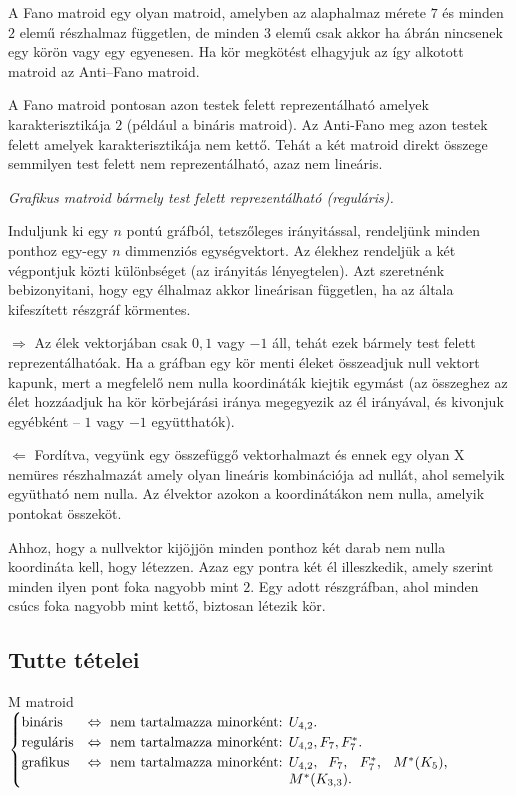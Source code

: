 A Fano matroid egy olyan matroid, amelyben az alaphalmaz mérete $7$ és minden
$2$ elemű részhalmaz független, de minden $3$ elemű csak akkor ha
 ábrán nincsenek egy körön vagy egy egyenesen. Ha kör megkötést
elhagyjuk az így alkotott matroid az Anti--Fano matroid.

A Fano matroid pontosan azon testek felett reprezentálható amelyek
karakterisztikája $2$ (például a bináris matroid). Az Anti-Fano meg azon testek
felett amelyek karakterisztikája nem kettő. Tehát a két matroid direkt összege
semmilyen test felett nem reprezentálható, azaz nem lineáris.

\vspace{0.4cm}
\emph{Grafikus matroid bármely test felett reprezentálható (reguláris).}
\vspace{0.4cm}

Induljunk ki egy $n$ pontú gráfból, tetszőleges irányitással, rendeljünk minden
ponthoz egy-egy $n$ dimmenziós egységvektort. Az élekhez rendeljük a két
végpontjuk közti különbséget (az irányitás lényegtelen). Azt szeretnénk
bebizonyitani, hogy egy élhalmaz akkor lineárisan független, ha az általa
kifeszített részgráf körmentes.

$\Rightarrow$  Az élek vektorjában csak $0,1$ vagy $-1$ áll, tehát ezek bármely
test felett reprezentálhatóak. Ha a gráfban egy kör menti éleket összeadjuk null vektort
kapunk, mert a megfelelő nem nulla koordináták kiejtik egymást (az összeghez az
élet hozzáadjuk ha kör körbejárási iránya megegyezik az él irányával, és
kivonjuk egyébként -- $1$ vagy $-1$ együtthatók).

$\Leftarrow$ Fordítva, vegyünk egy összefüggő vektorhalmazt és ennek egy olyan X
nemüres részhalmazát amely olyan lineáris kombinációja ad nullát, ahol semelyik
együtható nem nulla. Az élvektor azokon a koordinátákon nem nulla, amelyik
pontokat összeköt. 

Ahhoz, hogy a nullvektor kijöjjön minden ponthoz két darab nem nulla koordináta
kell, hogy létezzen. Azaz egy pontra két él illeszkedik, amely szerint minden
ilyen pont foka nagyobb mint $2$.  Egy adott részgráfban, ahol minden csúcs foka
nagyobb mint kettő, biztosan létezik kör.

\subsection{Tutte tételei}

M matroid $\begin{cases}
\mbox{bináris} &\Leftrightarrow \mbox{ nem tartalmazza minorként: } U_{4,2}. \\ 
\mbox{reguláris} &\Leftrightarrow \mbox{ nem tartalmazza minorként: } U_{4,2}, F_7, F_7^*. \\
\mbox{grafikus} &\Leftrightarrow \mbox{ nem tartalmazza minorként: } \parbox[t]{4cm}{
$U_{4,2},$ $F_7$, $F_7^*$, $M^*(K_5)$, $M^*(K_{3,3})$.} \\
\end{cases}$


